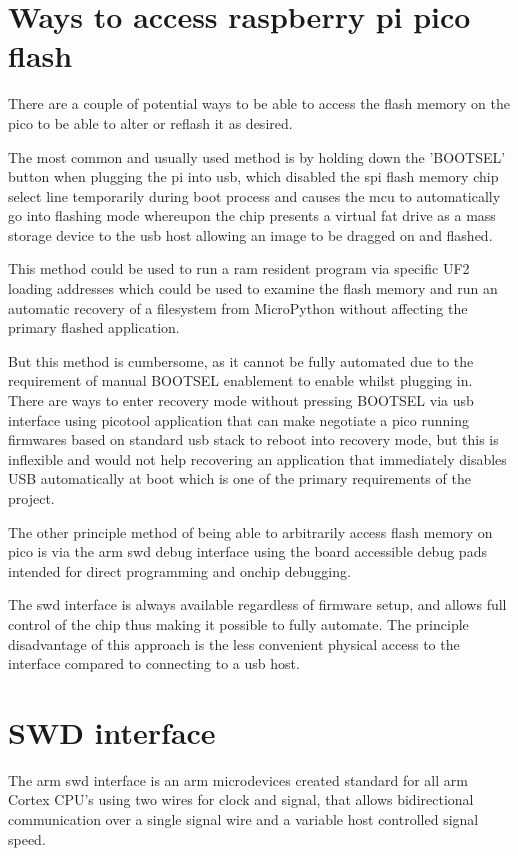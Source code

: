 \clearpage
\section{Ways to access raspberry pi pico flash}

There are a couple of potential ways to be able to access the flash memory on the pico to be able to alter or reflash it as desired.

The most common and usually used method is by holding down the 'BOOTSEL' button when plugging the pi into \gls{usb}, which disabled the \gls{spi} flash memory chip select line temporarily during boot process and causes the \gls{mcu} to automatically go into flashing mode whereupon the chip presents a virtual fat drive as a mass storage device to the \gls{usb} host allowing an image to be dragged on and flashed.

This method could be used to run a \gls{ram} resident program via specific UF2 loading addresses which could be used to examine the flash memory and run an automatic recovery of a filesystem from MicroPython without affecting the primary flashed application.

But this method is cumbersome, as it cannot be fully automated due to the requirement of manual BOOTSEL enablement to enable whilst plugging in. There are ways to enter recovery mode without pressing BOOTSEL via \gls{usb} interface using picotool application that can make negotiate a pico running firmwares based on standard \gls{usb} stack to reboot into recovery mode\cite{picotool}, but this is inflexible and would not help recovering an application that immediately disables USB automatically at boot which is one of the primary requirements of the project.

The other principle method of being able to arbitrarily access flash memory on pico is via the \gls{arm} \gls{swd} debug interface using the board accessible debug pads intended for direct programming and onchip debugging\cite{ARMDebugInterface}.

The \gls{swd} interface  is always available regardless of firmware setup, and allows full control of the chip thus making it possible to fully automate. The principle disadvantage of this approach is the less convenient physical access to the interface compared to connecting to a \gls{usb} host.
\clearpage
\section{SWD interface}
The \gls{arm} \gls{swd} interface is an \gls{arm} microdevices created standard for all \gls{arm} Cortex CPU's using two wires for clock and signal, that allows bidirectional communication over a single signal wire and a variable host controlled signal speed.

